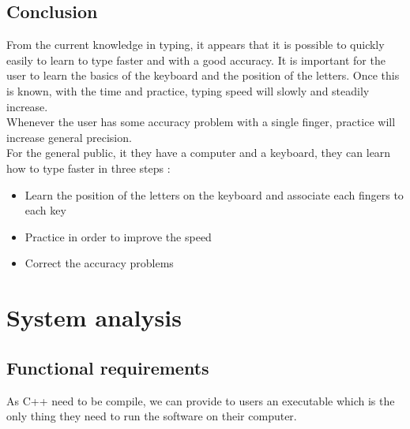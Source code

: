 \clearpage
\chapter{Conclusion}
From the current knowledge in typing, it appears that it is possible to quickly easily to learn to type faster and with a good accuracy. It is important for the user to learn the basics of the keyboard and the position of the letters. Once this is known, with the time and practice, typing speed will slowly and steadily increase.\\
Whenever the user has some accuracy problem with a single finger, practice will increase general precision.\\
For the general public, it they have a computer and a keyboard, they can learn how to type faster in three steps :
\begin{itemize}
	\item Learn the position of the letters on the keyboard and associate each fingers to each key
	\item Practice in order to improve the speed
	\item Correct the accuracy problems
\end{itemize}

\clearpage

\begin{flushleft}
	
	
\end{flushleft}

\part{System analysis}

\chapter{Functional requirements}
As C++ need to be compile, we can provide to users an executable which is the only thing they need to run the software on their computer.

